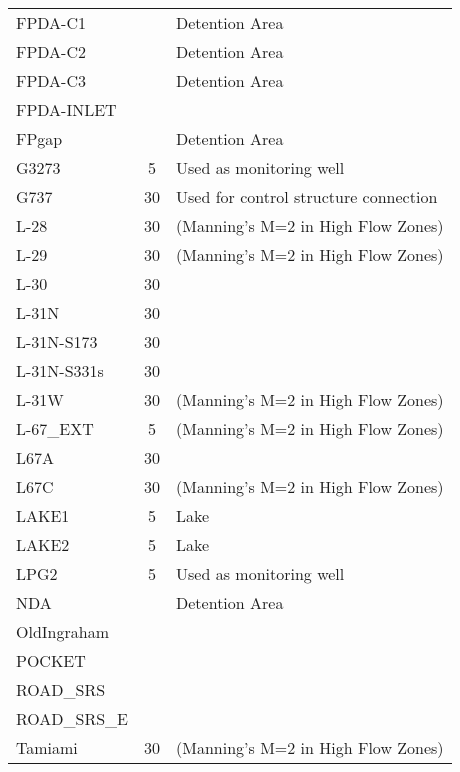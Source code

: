 \begin{table}[!h]
\begin{tabular}{lcl}
FPDA-C1            &              & Detention Area                              \\
FPDA-C2            &              & Detention Area                              \\
FPDA-C3            &              & Detention Area                              \\
FPDA-INLET         &              &                                             \\
FPgap              &              & Detention Area                              \\
G3273              & 5            & Used as monitoring well                     \\
G737               & 30           & Used for control structure connection       \\
L-28               & 30           & (Manning's M=2  in High Flow Zones)         \\
L-29               & 30           & (Manning's M=2  in High Flow Zones)         \\
L-30               & 30           &                                             \\
L-31N              & 30           &                                             \\
L-31N-S173         & 30           &                                             \\
L-31N-S331s        & 30           &                                             \\
L-31W              & 30           & (Manning's M=2  in High Flow Zones)         \\
L-67\_EXT          & 5            & (Manning's M=2  in High Flow Zones)         \\
L67A               & 30           &                                             \\
L67C               & 30           & (Manning's M=2  in High Flow Zones)         \\
LAKE1              & 5            & Lake                                        \\
LAKE2              & 5            & Lake                                        \\
LPG2               & 5            & Used as monitoring well                     \\
NDA                &              & Detention Area                              \\
OldIngraham        &              &                                             \\
POCKET             &              &                                             \\
ROAD\_SRS          &              &                                             \\
ROAD\_SRS\_E       &              &                                             \\
Tamiami            & 30           & (Manning's M=2  in High Flow Zones)         \\
\hline
\end{tabular}
\end{table}

